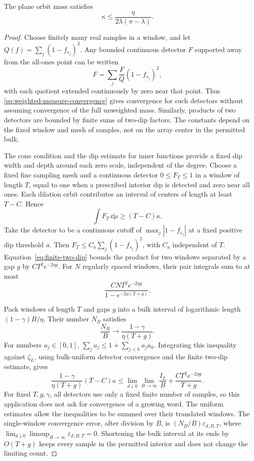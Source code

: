 \begin{lemma}\label{lem:detector-packing}
The plane orbit mass satisfies
\begin{equation}\label{eq:kappa-upper}
 \kappa\le\frac{\eta}{2\lambda(\pi-\lambda)}.
\end{equation}
\end{lemma}
\begin{proof}
Choose finitely many real samples in a window, and let
\(Q(f)=\sum_j(1-f_{s_j})^2\).
Any bounded continuous detector \(F\) supported away from the all-ones
point can be written
\[
 F=\sum_j \frac{F}{Q}(1-f_{s_j})^2,
\]
with each quotient extended continuously by zero near that point.
Thus \eqref{eq:weighted-measure-convergence} gives convergence for such
detectors without assuming convergence of the full unweighted mass.
Similarly, products of two detectors are bounded by finite sums of
two-dip factors. The constants depend on the fixed window and mesh of
samples, not on the array center in the permitted bulk.

The cone condition and the dip estimate for inner functions provide
a fixed dip width and depth around each zero scale, independent of the
degree. Choose a fixed fine sampling mesh and a continuous detector
\(0\le F_T\le1\) in a window of length \(T\), equal to one when a
prescribed interior dip is detected and zero near all ones.
Each dilation orbit contributes an interval of centers of length at
least \(T-C\). Hence
\[
 \int F_T\,\dd\mu\ge(T-C)\kappa.
\]
Take the detector to be a continuous cutoff of
\(\max_j|1-f_{s_j}|\) at a fixed positive dip threshold \(a\).
Then \(F_T\le C_a\sum_j(1-f_{s_j})^2\), with \(C_a\) independent of
\(T\). Equation~\eqref{eq:finite-two-dip} bounds the product for two
windows separated by a gap \(g\) by \(CT^2e^{-2\eta g}\).
For \(N\) regularly spaced windows, their pair integrals sum to at most
\[
 \frac{C N T^2e^{-2\eta g}}{1-e^{-2\eta(T+g)}}.
\]

Pack windows of length \(T\) and gaps \(g\) into a bulk interval of
logarithmic length \((1-\gamma)B/\eta\).
Their number \(N_B\) satisfies
\[
 \frac{N_B}{B}\longrightarrow
          \frac{1-\gamma}{\eta(T+g)}.
\]
For numbers \(a_j\in[0,1]\),
\(\sum_j a_j\le1+\sum_{j<k}a_ja_k\).
Integrating this inequality against \(\zeta_L\), using bulk-uniform
detector convergence and the finite two-dip estimate, gives
\[
 \frac{1-\gamma}{\eta(T+g)}(T-C)\kappa
 \le \lim_{d\downarrow0}\lim_{B\to\infty}\frac{I_L}{B}
       +\frac{CT^2 e^{-2\eta g}}{T+g}.
\]
For fixed \(T,g,\gamma\), all detectors use only a fixed finite number
of samples, so this application does not ask for convergence of a
growing word. The uniform estimates allow the inequalities to be summed
over their translated windows. The single-window convergence error,
after division by \(B\), is \((N_B/B)\varepsilon_{d,B,T}\), where
\(\lim_{d\downarrow0}\limsup_{B\to\infty}\varepsilon_{d,B,T}=0\).
Shortening the bulk interval at its ends by \(O(T+g)\) keeps every
sample in the permitted interior and does not change the limiting count.


\end{proof}
